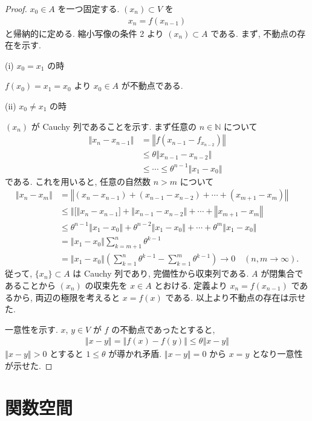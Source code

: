 \documentclass[openany, a4paper, oneside]{jsbook}
\theoremstyle{break}
\theoremstyle{breakdefn}
\newcommand{\norm}[1]{\left\Vert#1\right\Vert}
\newcommand{\rbk}[1]{\left (#1\right)}
\begin{document}
\begin{proof}
$x_0 \in A$ を一つ固定する.
$\rbk{x_n} \subset V$ を
\begin{align*}
 x_n
 =
 f \rbk{x_{n - 1}}
\end{align*}
と帰納的に定める.
縮小写像の条件 2 より $\rbk{x_n} \subset A$ である.
まず, 不動点の存在を示す.

(i) $x_0=x_1$ の時

$f(x_0)=x_1=x_0$ より $x_0\in A$ が不動点である.

(ii) $x_0\not=x_1$ の時

$\rbk{x_n}$ が Cauchy 列であることを示す.
まず任意の $n\in\mathbb{N}$ について
\begin{align*}
 \norm{x_n - x_{n - 1}}
 &=
 \norm{f(x_{n-1} - f_{x_{n-2}})} \\
 &\leq
 \theta \norm{x_{n-1} - x_{n-2}} \\
 &\leq
 \cdots
 \leq \theta^{n-1} \norm{x_1 - x_0}
\end{align*}
である.
これを用いると, 任意の自然数 $n>m$ について
\begin{align*}
 \norm{x_n - x_m}
 &=
 \norm{(x_n - x_{n-1}) + (x_{n-1} - x_{n-2}) + \cdots + (x_{m+1} - x_{m})} \\
 &\leq
 \norm[x_n - x_{n-1}] + \norm{x_{n-1} - x_{n-2}} + \cdots + \norm{x_{m+1} - x_{m}} \\
 &\leq
 \theta^{n-1} \norm{x_1 - x_0} + \theta^{n-2} \norm{x_1 - x_0} + \cdots + \theta^m \norm{x_1 - x_0} \\
 &=
 \norm{x_1 - x_0} \sum_{k = m + 1}^{n} \theta^{k-1} \\
 &=
 \norm{x_1 - x_0} \rbk{\sum_{k=1}^{n} \theta^{k-1} - \sum_{k=1}^{m} \theta^{k-1}} \to 0 \quad (n, m \to \infty).
\end{align*}
従って, $\{x_n\}\subset A$ は Cauchy 列であり, 完備性から収束列である.
$A$ が閉集合であることから $\rbk{x_n}$ の収束先を $x \in A$ とおける.
定義より $x_n = f(x_{n-1})$ であるから, 両辺の極限を考えると $x = f(x)$ である.
以上より不動点の存在は示せた.

一意性を示す.
$x$, $y \in V$ が $f$ の不動点であったとすると,
\begin{align*}
 \norm{x - y}
 =
 \norm{f(x) - f(y)}
 \leq
 \theta \norm{x - y}
\end{align*}
$\norm{x - y} > 0$ とすると $1 \leq \theta$ が導かれ矛盾.
$\norm{x - y} = 0$ から $x = y$ となり一意性が示せた.
\end{proof}
\section{関数空間}
\end{document}
